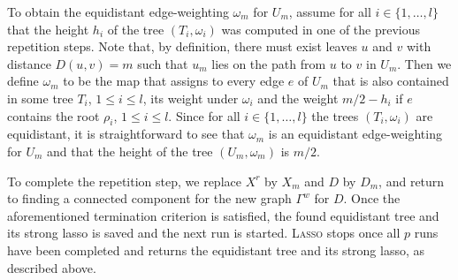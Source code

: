 To obtain the equidistant edge-weighting $\omega_m$ for $U_m$, assume for all
$i\in \{1,\ldots,l\}$ that the height $h_i$ of the tree $(T_i,\omega_i)$ was
computed in one of the previous repetition steps. Note that, by definition,
there must exist leaves $u$ and $v$ with distance $D(u,v)=m$ such that $u_m$
lies on the path from $u$ to $v$ in $U_m$. Then we define $\omega_m$ to be the
map that assigns to every edge $e$ of $U_m$ that is also contained in some
tree $T_i$, $1\leq i\leq l$, its weight under $\omega_i$ and the weight
$m/2-h_i$ if $e$ contains the root $\rho_i$, $1\leq i\leq l$. Since for all
$i\in \{1,\ldots,l\}$ the trees $(T_i,\omega_i)$ are equidistant, it is
straightforward to see that $\omega_m$ is an equidistant edge-weighting for
$U_m$ and that the height of the tree $(U_m,\omega_m) $ is $m/2$.

To complete the repetition step, we replace $X^r$ by $X_m$ and $D$ by $D_m$,
and return to finding a connected component for the new graph $\Gamma^w$ for
$D$. Once the aforementioned termination criterion is satisfied, the found
equidistant tree and its strong lasso is saved and the next run is
started. \textsc{Lasso} stops once all $p$ runs have been completed and returns
the equidistant tree and its strong lasso, as described above.

